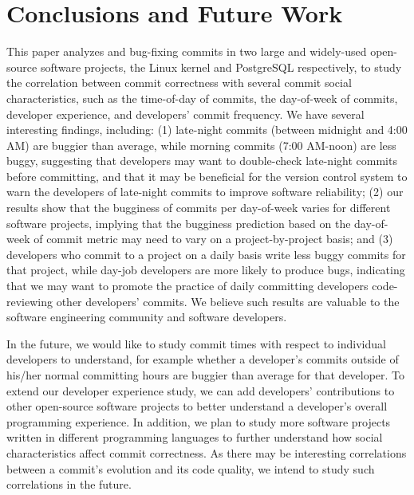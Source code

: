 \section{Conclusions and Future Work}
\label{sec-conclusion}

This paper analyzes \linuxBFC and \postBFC bug-fixing commits in two large and
widely-used open-source software projects, the Linux kernel and PostgreSQL
respectively, to study the correlation between commit correctness with several
commit social characteristics, such as the time-of-day of commits, the
day-of-week of commits, developer experience, and developers' commit 
frequency. We have several interesting findings, including: (1) late-night
commits (between midnight and 4:00 AM) are buggier than average, while morning
commits (7:00 AM-noon) are less buggy, suggesting that developers may want to
double-check late-night commits before committing, and that it may be beneficial
for the version control system to warn the developers of late-night commits to
improve software reliability; (2) our results show that the bugginess of commits
per day-of-week varies for different software projects, implying that the
bugginess prediction based on the day-of-week of commit metric may need to vary
on a project-by-project basis; and (3) developers who commit to a project on a
daily basis write less buggy commits for that project, while day-job developers
are more likely to produce bugs, indicating that we may want to promote the
practice of daily committing developers code-reviewing other developers'
commits.  We believe such results are valuable to the software engineering
community and software developers.

In the future, we would like to study commit times with respect to individual
developers to understand, for example whether a developer's commits outside of
his/her normal committing hours are buggier than average for that developer.  To
extend our developer experience study, we can add developers' contributions to
other open-source software projects to better understand a developer's overall
programming experience.  In addition, we plan to study more software projects
written in different programming languages to further understand how social
characteristics affect commit correctness.  As there may be interesting
correlations between a commit's evolution and its code quality, we intend to
study such correlations in the future.


